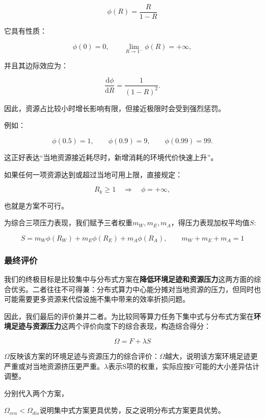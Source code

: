 \[
\phi(R)=\frac{R}{1-R}
\]

它具有性质：

\[
\phi(0)=0, \qquad \lim_{R\to1^-}\phi(R)=+\infty,
\]

并且其边际效应为：

\[
\frac{\mathrm d\phi}{\mathrm dR} = \frac{1}{(1-R)^2}.
\]

因此，资源占比较小时增长影响有限，但接近极限时会受到强烈惩罚。

例如：

\[
\phi(0.5)=1,\qquad \phi(0.9)=9,\qquad \phi(0.99)=99.
\]

这正好表达“当地资源接近耗尽时，新增消耗的环境代价快速上升”。

如果任何一项资源达到或超过当地可用上限，直接规定：

\[
R_k\ge 1 \quad\Longrightarrow\quad \phi=+\infty,
\]

也就是方案不可行。

为综合三项压力表现，我们赋予三者权重$m_W,m_E,m_A$，得压力表现加权平均值$S$:

\[
S=m_W\phi(R_W)+m_E\phi(R_E)+m_A\phi(R_A), \qquad m_W+m_E+m_A=1
\]

\subsubsection{最终评价}

我们的终极目标是比较集中与分布式方案在\textbf{降低环境足迹和资源压力}这两方面的综合优劣。二者往往不可得兼：分布式算力中心能分摊对当地资源的压力，但同时也可能需要更多资源来代偿设施不集中带来的效率折损问题。

因此，我们最后的评价兼并二者。为比较同等算力任务下集中式与分布式方案在\textbf{环境足迹与资源压力}这两个评价向度下的综合表现，构造综合得分：

\[
\Omega = F + \lambda S
\]

$\Omega$反映该方案的环境足迹与资源压力的综合评价：$\Omega$越大，说明该方案环境足迹更严重或对当地资源挤压更严重。$\lambda$表示S项的权重，实际应按F可能的大小差异估计调整。

分别代入两个方案，

$\Omega_{cen}<\Omega_{dis}$说明集中式方案更具优势，反之说明分布式方案更具优势。

